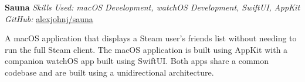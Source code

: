 \textbf{Sauna}  \newline
\textit{Skills Used: macOS Development, watchOS Development, SwiftUI, AppKit}\\
\textit{GitHub:} \href{https://github.com/\myweb/Sauna}{alexjohnj/sauna}

A macOS application that displays a Steam user's friends list without needing to
run the full Steam client. The macOS application is built using AppKit with a
companion watchOS app built using SwiftUI\@. Both apps share a common codebase
and are built using a unidirectional architecture.

